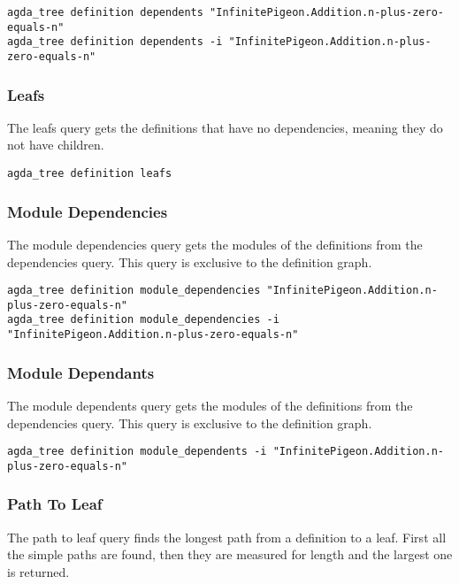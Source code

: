 \begin{lstlisting}
agda_tree definition dependents "InfinitePigeon.Addition.n-plus-zero-equals-n"
agda_tree definition dependents -i "InfinitePigeon.Addition.n-plus-zero-equals-n"
\end{lstlisting}

\subsubsection{Leafs}

The leafs query gets the definitions that have no dependencies, meaning they do
not have children.

\begin{lstlisting}
agda_tree definition leafs
\end{lstlisting}

\subsubsection{Module Dependencies}

The module dependencies query gets the modules of the definitions from the
dependencies query. This query is exclusive to the definition graph. 

\begin{lstlisting}
agda_tree definition module_dependencies "InfinitePigeon.Addition.n-plus-zero-equals-n"
agda_tree definition module_dependencies -i "InfinitePigeon.Addition.n-plus-zero-equals-n"
\end{lstlisting}

\subsubsection{Module Dependants}

The module dependents query gets the modules of the definitions from the
dependencies query. This query is exclusive to the definition graph. 

\begin{lstlisting}
agda_tree definition module_dependents -i "InfinitePigeon.Addition.n-plus-zero-equals-n"
\end{lstlisting}

\subsubsection{Path To Leaf}

The path to leaf query finds the longest path from a definition to a leaf.
First all the simple paths are found, then they are measured for length and the
largest one is returned.

